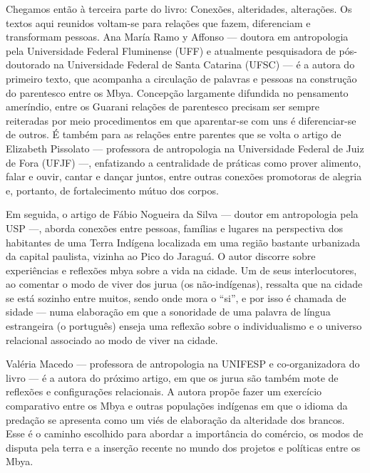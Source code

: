 \documentclass{article}
\begin{document}
Chegamos ent\~ao \`a terceira parte do livro: Conex\~oes, alteridades,
altera\c{c}\~oes. Os textos aqui reunidos voltam-se para rela\c{c}\~oes
que fazem, diferenciam e transformam pessoas. Ana Mar\'ia Ramo y
Affonso --- doutora em antropologia pela Universidade Federal
Fluminense (UFF) e atualmente pesquisadora de p\'os-doutorado na
Universidade Federal de Santa Catarina (UFSC)  {}--- \'e a autora do
primeiro texto, que acompanha a circula\c{c}\~ao de palavras e pessoas
na constru\c{c}\~ao do parentesco entre os Mbya. Concep\c{c}\~ao
largamente difundida no pensamento amer\'indio, entre os Guarani
rela\c{c}\~oes de parentesco precisam ser sempre reiteradas por meio
procedimentos em que aparentar-se com uns \'e diferenciar-se de outros.
\'E tamb\'em para as rela\c{c}\~oes entre parentes que se volta o
artigo de Elizabeth Pissolato --- professora de antropologia na
Universidade Federal de Juiz de Fora (UFJF) ---, enfatizando a
centralidade de pr\'aticas como prover alimento, falar e ouvir, cantar
e dan\c{c}ar juntos, entre outras conex\~oes promotoras de alegria e,
portanto, de fortalecimento m\'utuo dos corpos.

Em seguida, o artigo de F\'abio Nogueira da Silva --- doutor em
antropologia pela USP ---, aborda conex\~oes entre pessoas, fam\'ilias
e lugares na perspectiva dos habitantes de uma Terra Ind\'igena
localizada em uma regi\~ao bastante urbanizada da capital paulista,
vizinha ao Pico do Jaragu\'a. O autor discorre sobre experi\^encias e
reflex\~oes mbya sobre a vida na cidade. Um de seus interlocutores, ao
comentar o modo de viver dos jurua (os n\~ao-ind\'igenas), ressalta que
na cidade se est\'a sozinho entre muitos, sendo onde mora o
{\textquotedblleft}si{\textquotedblright}, e por isso \'e chamada de
sidade --- numa elabora\c{c}\~ao em que a sonoridade de uma palavra de
l\'ingua estrangeira (o portugu\^es) enseja uma reflex\~ao sobre o
individualismo e o universo relacional associado ao modo de viver na
cidade.

Val\'eria Macedo --- professora de antropologia na UNIFESP e
co-organizadora do livro --- \'e a autora do pr\'oximo artigo, em que
os jurua s\~ao tamb\'em mote de reflex\~oes e configura\c{c}\~oes
relacionais. A autora prop\~oe fazer um exerc\'icio comparativo entre
os Mbya e outras popula\c{c}\~oes ind\'igenas em que o idioma da
preda\c{c}\~ao se apresenta como um vi\'es de elabora\c{c}\~ao da
alteridade dos brancos. Esse \'e o caminho escolhido para abordar a
import\^ancia do com\'ercio, os modos de disputa pela terra e a
inser\c{c}\~ao recente no mundo dos projetos e pol\'iticas entre os
Mbya. 
\end{document}

